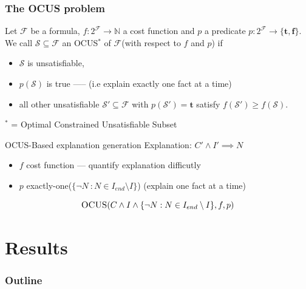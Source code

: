 \documentclass{beamer}
\theoremstyle{problemspec}
\newcommand\m[1]{\ensuremath{\mathcal{#1}}\xspace}
\newcommand\formula{\ensuremath{\m{F} }\xspace}
\renewcommand\emph[1]{{\color{vuborange}#1}}
\newcommand\nat{\m{\mathbb{N}}}
\newcommand\subsetT{\m{\mathcal{S}}}
\newcommand\ltrue{\m{\textbf{t}}}
\newcommand\lfalse{\m{\textbf{f}}}
\newcommand\call[1]{\m{\textsc{#1}}}
\begin{document}
	
		\begin{frame}
			\frametitle{The OCUS problem}
			\begin{definition}
				\small
				Let $\formula$ be a formula, $f:2^{\formula} \to \nat$ a cost function and  $p$ a predicate $p: 2^{\formula}\to \{\ltrue,\lfalse\}$. We call %
					$\subsetT \subseteq \formula$ an \emph{OCUS}$^*$ of \formula (with respect to $f$ and $p$) if \begin{itemize}                                      
						\item $\subsetT$ is unsatisfiable,
						\item $p(\subsetT)$ is true ----- (i.e explain exactly one fact at a time)
						\item \emph{all other unsatisfiable $\subsetT'\subseteq \formula$ with $p(\subsetT')=\ltrue$ satisfy $f(\subsetT')\geq f(\subsetT)$}.
					\end{itemize}
				\end{definition}
				$^*$ = Optimal \emph{Constrained} Unsatisfiable Subset
			\end{frame}
			
			
			

			\begin{frame}{OCUS-Based explanation generation}
				Explanation: 
				$ C' \wedge I' \implies N $
				\begin{itemize}
					\item $f$ cost function --- quantify explanation difficutly
					\item $p$ exactly-one($ \{\lnot N  \ : N \in   I_{end} \setminus I \}$) (explain one fact at a time)
				\end{itemize}
					\[\call{OCUS}(C \wedge I  \wedge \{\lnot N : N \in   I_{end} \setminus I \}, f, p)\]

			
				
			\end{frame}
			
			

			
			\section{Results}
						\begin{frame}
				\frametitle{Outline}
				\tableofcontents[currentsection]
			\end{frame}
			
\end{document}
